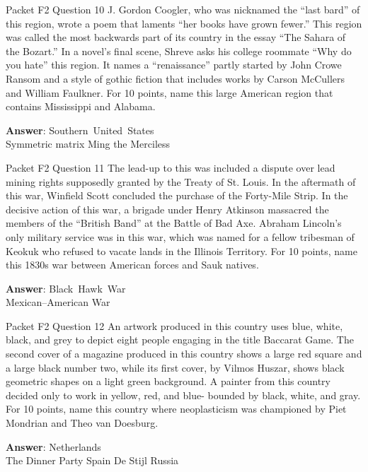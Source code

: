 \begin{frame}{Packet F2 Question 10}
J.   Gordon Coogler, who was nicknamed the “last   bard” of this region, wrote a poem that laments “her books have grown fewer.” This region was called the most backwards part of its country in the essay “The Sahara of the Bozart.” In a novel’s final     scene, Shreve asks   his college roommate “Why do you hate” this region. It names a “renaissance” partly started by John Crowe Ransom and a style of gothic fiction that includes works by Carson McCullers and William Faulkner. For 10 points, name this large American region that   contains Mississippi and Alabama.

\textbf{Answer}: Southern\ United\ States\\
 Symmetric matrix
 Ming the Merciless
\end{frame}

\begin{frame}{Packet F2 Question 11}
The lead-up to this was included a dispute over lead mining rights supposedly granted by the Treaty of St. Louis. In the aftermath of this war, Winfield Scott concluded   the purchase of the Forty-Mile Strip. In the decisive action of this war, a brigade under Henry Atkinson massacred the members of the   “British Band” at the   Battle of Bad Axe. Abraham Lincoln’s   only military service was in this war, which was named for a fellow tribesman of Keokuk who refused   to vacate lands in the Illinois Territory. For 10 points, name this 1830s war between American forces and Sauk natives.

\textbf{Answer}: Black\ Hawk\ War\\
 Mexican–American War
\end{frame}

\begin{frame}{Packet F2 Question 12}
An artwork produced in   this country uses blue, white, black, and grey to depict eight people engaging in the title Baccarat Game. The second cover of a magazine produced in this country shows a large red square and a large black number two, while its first cover, by Vilmos Huszar, shows black geometric shapes on a light green background. A painter from this country decided only to work in yellow, red,   and blue- bounded by black, white, and gray. For 10 points, name this country where neoplasticism was championed by Piet Mondrian and Theo   van Doesburg.  

\textbf{Answer}: Netherlands\\
 The Dinner Party
 Spain
 De Stijl
 Russia
\end{frame}

